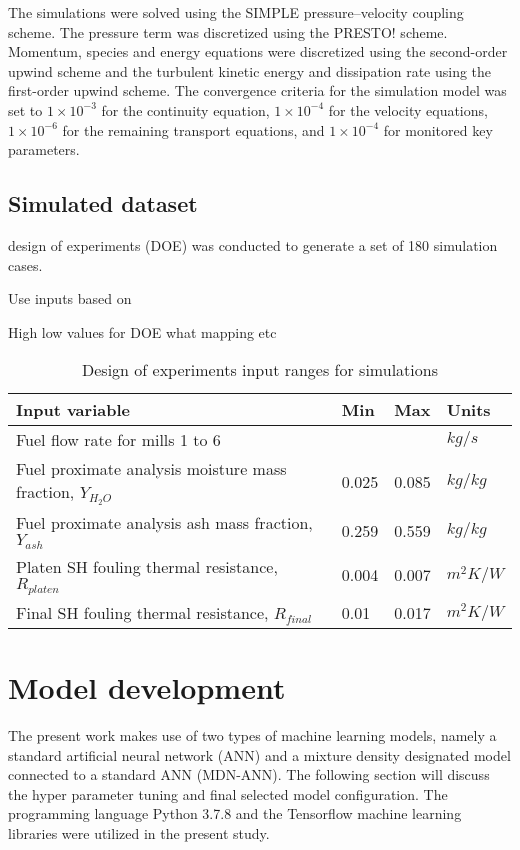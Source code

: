 \documentclass[a4paper,fleqn]{cas-sc}
\begin{document}
The simulations were solved using the SIMPLE pressure–velocity coupling scheme. The pressure term 
was discretized using the PRESTO! scheme. Momentum, species and energy equations were discretized 
using the second-order upwind scheme and the turbulent kinetic energy and dissipation rate using
the first-order upwind scheme. The convergence criteria for the simulation model was set to $1\times10^{-3}$ for the continuity equation, $1\times10^{-4}$ for the velocity equations, $1\times10^{-6}$ for the remaining transport equations, and $1\times10^{-4}$ for monitored key parameters.

\subsection{Simulated dataset}
design of experiments (DOE) was conducted to generate a set of 180 simulation cases.

Use inputs based on 

High low values for DOE what mapping etc

\begin{table}[h!]
\caption{Design of experiments input ranges for  simulations}\label{tbl_doe}
\begin{tabular*}{\tblwidth}{p{}p{}p{}p{}}
\toprule
 Input variable& Min& Max& Units \\ %
\midrule
 Fuel flow rate for mills 1 to 6 & & & $kg/s$ \\
 Fuel proximate analysis moisture mass fraction, $Y_{H_2O}$ & 0.025 & 0.085 & $kg/kg$ \\
 Fuel proximate analysis ash mass fraction, $Y_{ash}$  & 0.259 & 0.559 & $kg/kg$ \\
 Platen SH fouling thermal resistance, $R_{platen}$  & 0.004 & 0.007 & $m^2K/W$ \\
 Final SH fouling thermal resistance, $R_{final}$  &0.01 & 0.017 & $m^2K/W$ \\
\bottomrule
\end{tabular*}
\end{table}

\section{Model development}

The present work makes use of two types of machine learning models, namely a standard artificial neural network (ANN) and a mixture density designated model connected to a standard ANN (MDN-ANN). The following section will discuss the hyper parameter tuning and final selected model configuration. The programming language Python 3.7.8 and the Tensorflow machine learning libraries were utilized in the present study. 
\end{document}
